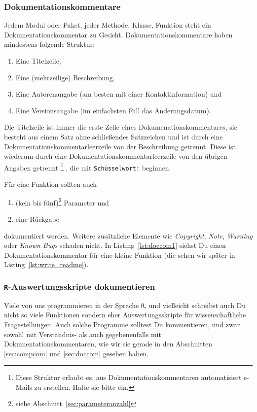 \documentclass[twoside]{scrartcl}
\providecommand{\R}{\texttt{R}}
\providecommand{\code}[1]{\texttt{#1}}
\begin{document}
\subsubsection{Dokumentationskommentare\label{sec:doccom}}
Jedem Modul oder Paket, jeder Methode, Klasse, Funktion steht ein
Dokumentationskommentar zu Gesicht. Dokumentationskommentare haben mindestens 
folgende Struktur:
\begin{enumerate}
    \item Eine Titelzeile,
    \item Eine (mehrzeilige) Beschreibung,
    \item Eine Autorenangabe (am besten mit einer Kontaktinformation) und
    \item Eine Versionsangabe (im einfachsten Fall das \"A{}nderungsdatum).
\end{enumerate}
Die Titelzeile ist immer die erste Zeile eines Dokumenationskommentares, sie
besteht aus einem Satz ohne schlie\ss{}endes Satzzeichen und ist durch eine
Dokumentationskommentarleerzeile von der Beschreibung getrennt. Diese ist
wiederum durch eine Dokumentationskommentarleerzeile von den \"u{}brigen Angaben
getrennt%
\footnote{Diese Struktur erlaubt es, aus Dokumentationskommentaren
automatisiert e-Mails zu erstellen. Halte sie bitte ein.}%
, die mit \code{Sch\"u{}sselwort:} beginnen.

F\"u{}r eine Funktion sollten auch 
\begin{enumerate}[resume]
    \item (kein bis f\"u{}nf)\footnote{siehe
	    Abschnitt~\ref{sec:parameteranzahl}} Parameter und 
    \item eine R\"u{}ckgabe
\end{enumerate}
dokumentiert werden. Weitere zus\"a{}tzliche Elemente wie \emph{Copyright},
\emph{Note}, \emph{Warning} oder \emph{Known Bugs} schaden nicht.
In Listing~\ref{lst:doccom1} siehst Du einen Dokumentationskommentar
f\"u{}r eine kleine Funktion (die sehen wir sp\"a{}ter in
Listing~\ref{lst:write_readme}).


\subsubsection{\R{}-Auswertungsskripte dokumentieren
\label{sec:rdoc}
}
Viele von uns programmieren in der Sprache \R{}, und vielleicht schreibst 
auch Du nicht so viele Funktionen sondern eher Auswertungsskripte f\"u{}r 
wissenschaftliche Fragestellungen. 
Auch solche Programme solltest Du kommentieren, und zwar sowohl mit 
Verst\"a{}ndnis- als auch gegebenenfalls mit  Dokumentationskommentaren, wie wir
sie gerade in den Abschnitten \ref{sec:compcom} und \ref{sec:doccom} gesehen 
haben.
\end{document}

